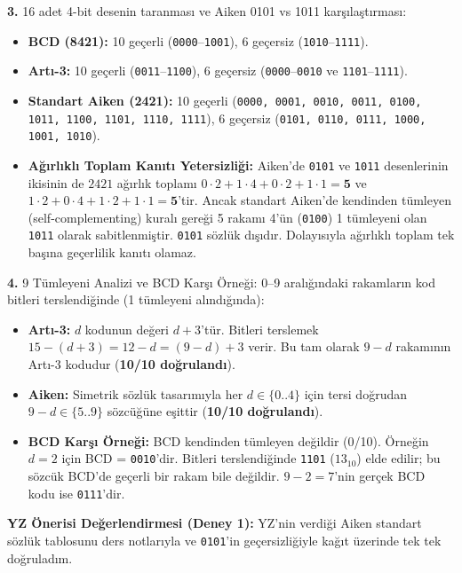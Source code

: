 \documentclass[10pt,a4paper]{article}
\begin{document}
\textbf{3.} 16 adet 4-bit desenin taranması ve Aiken 0101 vs 1011 karşılaştırması:
\begin{itemize}
    \item \textbf{BCD (8421):} 10 geçerli (\texttt{0000}--\texttt{1001}), 6 geçersiz (\texttt{1010}--\texttt{1111}).
    \item \textbf{Artı-3:} 10 geçerli (\texttt{0011}--\texttt{1100}), 6 geçersiz (\texttt{0000}--\texttt{0010} ve \texttt{1101}--\texttt{1111}).
    \item \textbf{Standart Aiken (2421):} 10 geçerli (\texttt{0000, 0001, 0010, 0011, 0100, 1011, 1100, 1101, 1110, 1111}), 6 geçersiz (\texttt{0101, 0110, 0111, 1000, 1001, 1010}).
    \item \textbf{Ağırlıklı Toplam Kanıtı Yetersizliği:} Aiken'de \texttt{0101} ve \texttt{1011} desenlerinin ikisinin de $2421$ ağırlık toplamı $0\cdot 2 + 1\cdot 4 + 0\cdot 2 + 1\cdot 1 = \mathbf{5}$ ve $1\cdot 2 + 0\cdot 4 + 1\cdot 2 + 1\cdot 1 = \mathbf{5}$'tir. Ancak standart Aiken'de kendinden tümleyen (self-complementing) kuralı gereği 5 rakamı 4'ün (\texttt{0100}) 1 tümleyeni olan \texttt{1011} olarak sabitlenmiştir. \texttt{0101} sözlük dışıdır. Dolayısıyla ağırlıklı toplam tek başına geçerlilik kanıtı olamaz.
\end{itemize}

\textbf{4.} 9 Tümleyeni Analizi ve BCD Karşı Örneği:
0--9 aralığındaki rakamların kod bitleri terslendiğinde (1 tümleyeni alındığında):
\begin{itemize}
    \item \textbf{Artı-3:} $d$ kodunun değeri $d+3$'tür. Bitleri terslemek $15 - (d+3) = 12 - d = (9-d) + 3$ verir. Bu tam olarak $9-d$ rakamının Artı-3 kodudur (\textbf{10/10 doğrulandı}).
    \item \textbf{Aiken:} Simetrik sözlük tasarımıyla her $d \in \{0..4\}$ için tersi doğrudan $9-d \in \{5..9\}$ sözcüğüne eşittir (\textbf{10/10 doğrulandı}).
    \item \textbf{BCD Karşı Örneği:} BCD kendinden tümleyen değildir (0/10). Örneğin $d=2$ için BCD = \texttt{0010}'dir. Bitleri terslendiğinde \texttt{1101} ($13_{10}$) elde edilir; bu sözcük BCD'de geçerli bir rakam bile değildir. $9 - 2 = 7$'nin gerçek BCD kodu ise \texttt{0111}'dir.
\end{itemize}
\textbf{YZ Önerisi Değerlendirmesi (Deney 1):} YZ'nin verdiği Aiken standart sözlük tablosunu ders notlarıyla ve \texttt{0101}'in geçersizliğiyle kağıt üzerinde tek tek doğruladım.

\newpage
\end{document}
